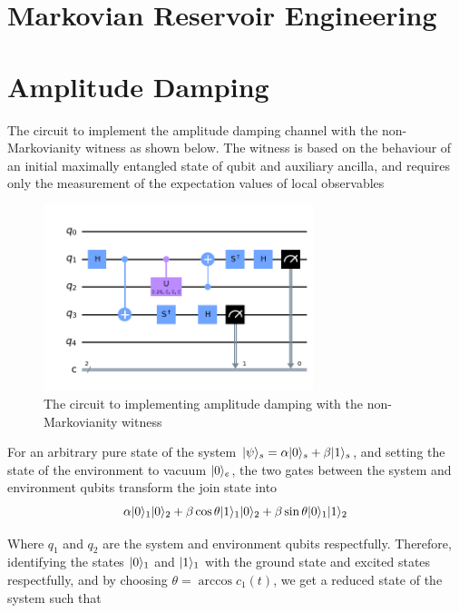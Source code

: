 \documentclass[12pt]{article}
\DeclarePairedDelimiter{\ket}{\lvert}{\rangle}
\begin{document}
  \section{Markovian Reservoir Engineering}
  \blindtext

  \section{Amplitude Damping}
  The circuit to implement the amplitude damping channel with the non-Markovianity witness as shown below. The witness is based on the behaviour of an initial maximally entangled state of qubit and auxiliary ancilla, and requires only the measurement of the expectation values of local observables

  \begin{figure}[h]
    \centering
    \includegraphics[width=0.7\textwidth]{images/amplitude_damping_yy_circuit}
    \caption{The circuit to implementing amplitude damping with the non-Markovianity witness %
            \label{fig:amplitude_damping_circuit}}
  \end{figure}
  For an arbitrary pure state of the system $\ket{\psi}_{s} = \alpha\ket{0}_{s} + \beta\ket{1}_{s}$, and setting the state of the environment to vacuum $\ket{0}_{e}$, the two gates between the system and environment qubits transform the join state into 
  \begin{equation}
    \alpha\ket{0}_{1}\ket{0}_{2} + \beta\cos \theta \ket{1}_{1}\ket{0}_{2} + \beta\sin \theta \ket{0}_{1}\ket{1}_{2}
  \end{equation}

  Where $q_{1}$ and $q_{2}$ are the system and environment qubits respectfully. Therefore, identifying the states $\ket{0}_{1}$ and $\ket{1}_{1}$ with the ground state and excited states respectfully, and by choosing $\theta = \arccos c_{1}(t)$, we get a reduced state of the system such that
\end{document}
